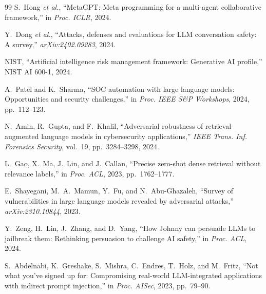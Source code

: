 \begin{thebibliography}{99}
S.~Hong \emph{et al.}, ``MetaGPT: Meta programming for a multi-agent collaborative framework,'' in \emph{Proc. ICLR}, 2024.

Y.~Dong \emph{et al.}, ``Attacks, defenses and evaluations for LLM conversation safety: A survey,'' \emph{arXiv:2402.09283}, 2024.

{NIST}, ``Artificial intelligence risk management framework: Generative AI profile,'' NIST AI 600-1, 2024.

A.~Patel and K.~Sharma, ``SOC automation with large language models: Opportunities and security challenges,'' in \emph{Proc. IEEE S\&P Workshops}, 2024, pp.~112--123.

N.~Amin, R.~Gupta, and F.~Khalil, ``Adversarial robustness of retrieval-augmented language models in cybersecurity applications,'' \emph{IEEE Trans. Inf. Forensics Security}, vol.~19, pp.~3284--3298, 2024.

L.~Gao, X.~Ma, J.~Lin, and J.~Callan, ``Precise zero-shot dense retrieval without relevance labels,'' in \emph{Proc. ACL}, 2023, pp.~1762--1777.

E.~Shayegani, M.~A.~Mamun, Y.~Fu, and N.~Abu-Ghazaleh, ``Survey of vulnerabilities in large language models revealed by adversarial attacks,'' \emph{arXiv:2310.10844}, 2023.

Y.~Zeng, H.~Lin, J.~Zhang, and D.~Yang, ``How Johnny can persuade LLMs to jailbreak them: Rethinking persuasion to challenge AI safety,'' in \emph{Proc. ACL}, 2024.

S.~Abdelnabi, K.~Greshake, S.~Mishra, C.~Endres, T.~Holz, and M.~Fritz, ``Not what you've signed up for: Compromising real-world LLM-integrated applications with indirect prompt injection,'' in \emph{Proc. AISec}, 2023, pp.~79--90.

\end{thebibliography}

